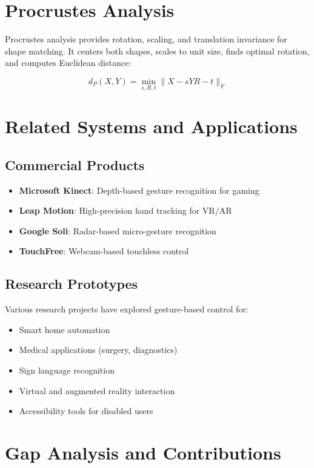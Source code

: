 \documentclass[12pt,a4paper]{report}
\begin{document}
\section{Procrustes Analysis}

Procrustes analysis provides rotation, scaling, and translation invariance for shape matching. It centers both shapes, scales to unit size, finds optimal rotation, and computes Euclidean distance:

\[
d_P(X, Y) = \min_{s, R, t} \|X - sYR - t\|_F
\]

\section{Related Systems and Applications}

\subsection{Commercial Products}
\begin{itemize}
    \item \textbf{Microsoft Kinect}: Depth-based gesture recognition for gaming
    \item \textbf{Leap Motion}: High-precision hand tracking for VR/AR
    \item \textbf{Google Soli}: Radar-based micro-gesture recognition
    \item \textbf{TouchFree}: Webcam-based touchless control
\end{itemize}

\subsection{Research Prototypes}
Various research projects have explored gesture-based control for:
\begin{itemize}
    \item Smart home automation
    \item Medical applications (surgery, diagnostics)
    \item Sign language recognition
    \item Virtual and augmented reality interaction
    \item Accessibility tools for disabled users
\end{itemize}

\section{Gap Analysis and Contributions}
\end{document}
